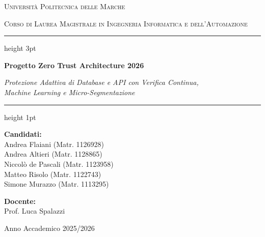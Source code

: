 \documentclass[12pt,a4paper]{article}
\begin{document}
\begin{titlepage}
    \centering
    \vspace*{1.5cm}
    
    {\scshape\LARGE Università Politecnica delle Marche \par}
    \vspace{0.4cm}
    {\scshape\Large Corso di Laurea Magistrale in Ingegneria Informatica e dell'Automazione \par}
    
    \vspace{2cm}
    
    {\color{copper}\hrule height 3pt}
    \vspace{0.6cm}
    {\huge\bfseries\color{copper} Progetto Zero Trust Architecture 2026 \par}
    \vspace{0.4cm}
    {\large\itshape\color{textmuted} Protezione Adattiva di Database e API con Verifica Continua, \\ Machine Learning e Micro-Segmentazione \par}
    \vspace{0.6cm}
    {\color{copper}\hrule height 1pt}
    
    \vspace{2.5cm}
    
    \begin{minipage}[t]{0.55\textwidth}
        \begin{flushleft}
            \large
            \textbf{\color{copper} Candidati:}\\
            \vspace{0.2cm}
            Andrea Flaiani (Matr. 1126928)\\
            Andrea Altieri (Matr. 1128865)\\
            Niccolò de Pascali (Matr. 1123958)\\
            Matteo Risolo (Matr. 1122743)\\
            Simone Murazzo (Matr. 1113295)
        \end{flushleft}
    \end{minipage}
    \hfill
    \begin{minipage}[t]{0.40\textwidth}
        \begin{flushright}
            \large
            \textbf{\color{copper} Docente:}\\
            \vspace{0.2cm}
            Prof. Luca Spalazzi
        \end{flushright}
    \end{minipage}
    
    \vfill
    
    \vspace{1.5cm}
    {\large\color{textmuted} Anno Accademico 2025/2026 \par}
\end{titlepage}
\end{document}

